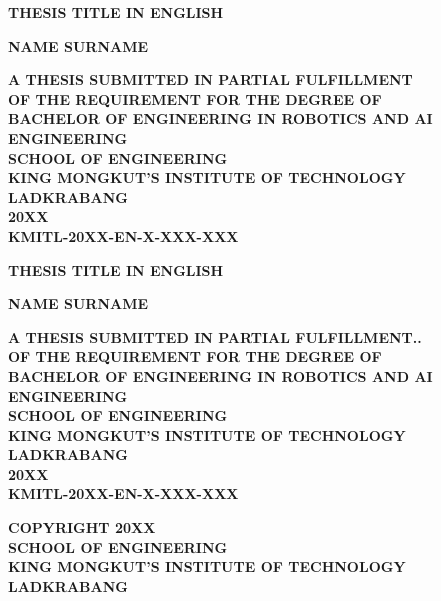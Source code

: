 \documentclass[16pt,a4paper]{extreport}
\begin{document}
\begin{titlepage}
    \fontsize{18pt}{18pt}\bfseries THESIS TITLE IN ENGLISH \\[1.5em]
    \centering
    \vfill
    \begin{center}
        {\fontsize{18pt}{18pt}\bfseries NAME SURNAME\par}
    \end{center}
    \vfill
    \vfill
    {\fontsize{18pt}{18pt}\bfseries
    A THESIS SUBMITTED IN PARTIAL FULFILLMENT \\ OF THE REQUIREMENT FOR THE DEGREE OF \\ BACHELOR OF ENGINEERING IN ROBOTICS AND AI ENGINEERING \\ SCHOOL OF ENGINEERING \\ KING MONGKUT'S INSTITUTE OF TECHNOLOGY LADKRABANG \\ 20XX \\ KMITL-20XX-EN-X-XXX-XXX}
\end{titlepage}

\begin{titlepage}
	\fontsize{18pt}{18pt}\bfseries THESIS TITLE IN ENGLISH \\[1.5em]
	\centering
	\vfill
	\begin{center}
		{\fontsize{18pt}{18pt}\bfseries NAME SURNAME\par}
	\end{center}
	\vfill
	\vfill
	{\fontsize{18pt}{18pt}\bfseries
		A THESIS SUBMITTED IN PARTIAL FULFILLMENT.. \\ OF THE REQUIREMENT FOR THE DEGREE OF \\ BACHELOR OF ENGINEERING IN ROBOTICS AND AI ENGINEERING \\ SCHOOL OF ENGINEERING \\ KING MONGKUT'S INSTITUTE OF TECHNOLOGY LADKRABANG \\ 20XX \\ KMITL-20XX-EN-X-XXX-XXX}
\end{titlepage}

\newpage
\thispagestyle{empty}
\vspace*{\fill}
    {\fontsize{18pt}{18pt}\bfseries
    \noindent
    COPYRIGHT 20XX \\
    SCHOOL OF ENGINEERING \\
    KING MONGKUT'S INSTITUTE OF TECHNOLOGY LADKRABANG}
\end{document}
